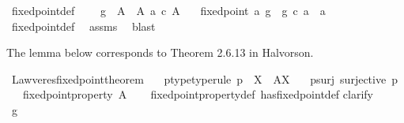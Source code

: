 \begin{isabellebody}
\isanewline
{}\isamarkupfalse%
\ fixed{\isacharunderscore}{\kern0pt}point{\isacharunderscore}{\kern0pt}def{}{\isacharcolon}{\kern0pt}\ \isanewline
\ \ \ {\isachardoublequoteopen}g\ {\isacharcolon}{\kern0pt}\ A\ {\isasymrightarrow}\ A{\isachardoublequoteclose}\ {\isachardoublequoteopen}a\ {\isasymin}\isactrlsub c\ A{\isachardoublequoteclose}\isanewline
\ \ \ {\isachardoublequoteopen}fixed{\isacharunderscore}{\kern0pt}point\ a\ g\ {\isacharequal}{\kern0pt}\ {\isacharparenleft}{\kern0pt}g\ {\isasymcirc}\isactrlsub c\ a\ {\isacharequal}{\kern0pt}\ a{\isacharparenright}{\kern0pt}{\isachardoublequoteclose}\isanewline
%
\isadelimproof
\ \ %
\endisadelimproof
%
\isatagproof
{}\isamarkupfalse%
\ fixed{\isacharunderscore}{\kern0pt}point{\isacharunderscore}{\kern0pt}def\ \isamarkupfalse%
\ assms\ \isamarkupfalse%
\ blast%
\endisatagproof
{\isafoldproof}%
%
\isadelimproof
%
\endisadelimproof
%
\begin{isamarkuptext}%
The lemma below corresponds to Theorem 2.6.13 in Halvorson.%
\end{isamarkuptext}\isamarkuptrue%
\isamarkupfalse%
\ Lawveres{\isacharunderscore}{\kern0pt}fixed{\isacharunderscore}{\kern0pt}point{\isacharunderscore}{\kern0pt}theorem{\isacharcolon}{\kern0pt}\isanewline
\ \ \ p{\isacharunderscore}{\kern0pt}type{\isacharbrackleft}{\kern0pt}type{\isacharunderscore}{\kern0pt}rule{\isacharbrackright}{\kern0pt}{\isacharcolon}{\kern0pt}\ {\isachardoublequoteopen}p\ {\isacharcolon}{\kern0pt}\ X\ {\isasymrightarrow}\ A\isactrlbsup X\isactrlesup {\isachardoublequoteclose}\isanewline
\ \ \ p{\isacharunderscore}{\kern0pt}surj{\isacharcolon}{\kern0pt}\ {\isachardoublequoteopen}surjective\ p{\isachardoublequoteclose}\isanewline
\ \ \ {\isachardoublequoteopen}fixed{\isacharunderscore}{\kern0pt}point{\isacharunderscore}{\kern0pt}property\ A{\isachardoublequoteclose}\isanewline
%
\isadelimproof
\ \ %
\endisadelimproof
%
\isatagproof
{}\isamarkupfalse%
\ fixed{\isacharunderscore}{\kern0pt}point{\isacharunderscore}{\kern0pt}property{\isacharunderscore}{\kern0pt}def\ has{\isacharunderscore}{\kern0pt}fixed{\isacharunderscore}{\kern0pt}point{\isacharunderscore}{\kern0pt}def\isanewline
{}\isamarkupfalse%
{\isacharparenleft}{\kern0pt}clarify{\isacharparenright}{\kern0pt}\ \isanewline
\ \ \isamarkupfalse%
\ g\ \isanewline
\ \ \isamarkupfalse%

\end{isabellebody}
